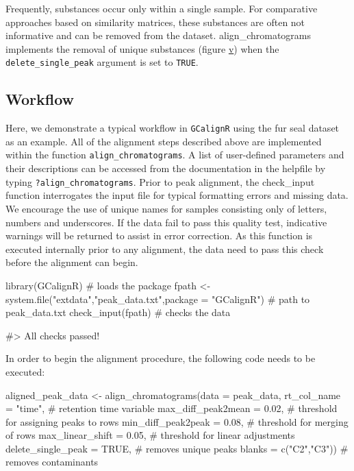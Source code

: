 Frequently, substances occur only within a single sample. For
comparative approaches based on similarity matrices, these substances
are often not informative and can be removed from the dataset.
align\_chromatograms implements the removal of unique substances (figure
\href{figure:algorithm} v) when the \texttt{delete\_single\_peak}
argument is set to \texttt{TRUE}.

\subsection{Workflow}\label{workflow}

Here, we demonstrate a typical workflow in \texttt{GCalignR} using the
fur seal dataset as an example. All of the alignment steps described
above are implemented within the function \texttt{align\_chromatograms}.
A list of user-defined parameters and their descriptions can be accessed
from the documentation in the helpfile by typing
\texttt{?align\_chromatograms}. Prior to peak alignment, the
check\_input function interrogates the input file for typical formatting
errors and missing data. We encourage the use of unique names for
samples consisting only of letters, numbers and underscores. If the data
fail to pass this quality test, indicative warnings will be returned to
assist in error correction. As this function is executed internally
prior to any alignment, the data need to pass this check before the
alignment can begin.

\begin{Schunk}
\begin{Sinput}
library(GCalignR) # loads the package 
fpath <- system.file("extdata","peak_data.txt",package = "GCalignR") # path to peak_data.txt
check_input(fpath) # checks the data
\end{Sinput}
\begin{Soutput}
#> All checks passed!
\end{Soutput}
\end{Schunk}

In order to begin the alignment procedure, the following code needs to
be executed:

\begin{Schunk}
\begin{Sinput}
aligned_peak_data <- align_chromatograms(data = peak_data,
        rt_col_name = "time", # retention time variable
        max_diff_peak2mean = 0.02, # threshold for assigning peaks to rows
        min_diff_peak2peak = 0.08, # threshold for merging of rows
        max_linear_shift = 0.05, # threshold for linear adjustments
        delete_single_peak = TRUE, # removes unique peaks
        blanks = c("C2","C3")) # removes contaminants
\end{Sinput}
\end{Schunk}

